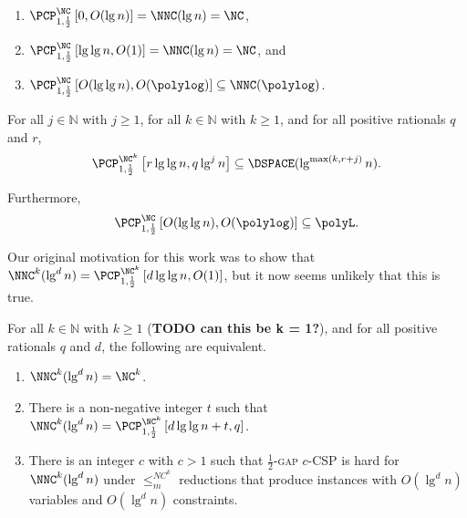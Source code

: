 \documentclass[]{article}
\newcommand{\PCPcs}[5]{\PCP^{#1}_{#2, #3}\left[#4, #5\right]}
\begin{document}
\begin{corollary}\label{cor:pcpinnnc}
  \mbox{}
  \begin{enumerate}
  \item $\PCPcs{\NC}{1}{\frac{1}{2}}{0}{O(\lg n)} = \NNC(\lg n) = \NC$,
  \item $\PCPcs{\NC}{1}{\frac{1}{2}}{\lg \lg n}{O(1)} = \NNC(\lg n) = \NC$, and
  \item $\PCPcs{\NC}{1}{\frac{1}{2}}{O(\lg \lg n)}{O(\polylog)} \subseteq \NNC(\polylog)$.
  \end{enumerate}
\end{corollary}

\begin{corollary}
  For all $j \in \mathbb{N}$ with $j \geq 1$, for all $k \in \mathbb{N}$ with $k \geq 1$, and for all positive rationals $q$ and $r$,
  \begin{equation*}
    \PCPcs{\NC^k}{1}{\frac{1}{2}}{r \lg \lg n}{q \lg^j n} \subseteq \DSPACE(\lg^{\max(k, r + j)} n).
  \end{equation*}

  Furthermore,
  \begin{equation*}
    \PCPcs{\NC}{1}{\frac{1}{2}}{O(\lg \lg n)}{O(\polylog)} \subseteq \polyL.
  \end{equation*}
\end{corollary}



Our original motivation for this work was to show that $\NNC^k(\lg^d n) = \PCPcs{\NC^k}{1}{\frac{1}{2}}{d \lg \lg n}{O(1)}$, but it now seems unlikely that this is true.

\begin{theorem}\label{thm:equiv}
  For all $k \in \mathbb{N}$ with $k \geq 1$ (\textbf{TODO can this be k = 1?}), and for all positive rationals $q$ and $d$, the following are equivalent.
  \begin{enumerate}
  \item $\NNC^k(\lg^d n) = \NC^k$.
  \item There is a non-negative integer $t$ such that $\NNC^k(\lg^d n) = \PCPcs{\NC^k}{1}{\frac{1}{2}}{d \lg \lg n + t}{q}$.
  \item There is an integer $c$ with $c > 1$ such that \textsc{$\frac{1}{2}$-gap $c$-CSP} is hard for $\NNC^k(\lg^d n)$ under $\leq_m^{NC^k}$ reductions that produce instances with $O(\lg^d n)$ variables and $O(\lg^d n)$ constraints.
  \end{enumerate}
\end{theorem}
\end{document}

